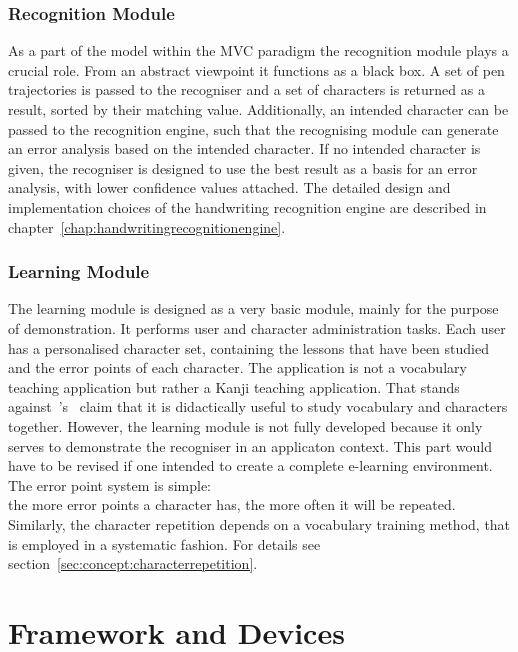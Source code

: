 \subsubsection{Recognition Module}
\label{sec:arch:recognitionmodule}
As a part of the model within the MVC paradigm the recognition module plays
a crucial role. From an abstract viewpoint it functions as a black box.
A set of pen trajectories is passed to the recogniser and a set of
characters is returned as a result, sorted by their matching value.
Additionally, an intended character can be passed to the recognition engine,
such that the recognising module can generate an error analysis based on the 
intended character. If no intended character is given, the recogniser is designed
to use the best result as a basis for an error analysis, with lower confidence
values attached. The detailed design and implementation choices of the 
handwriting recognition engine are described in 
chapter~\ref{chap:handwritingrecognitionengine}.

\subsubsection{Learning Module}
\label{sec:arch:learningmodule}

The learning module is designed as a very basic module, mainly for the purpose of 
demonstration. It performs user and character administration tasks.
Each user has a personalised character set, containing the lessons that have been
studied and the error points of each character.
The application is not a vocabulary teaching application 
but rather a Kanji teaching application. That stands 
against~\shortciteANP{}'s~\citeyear{} claim that it is didactically useful 
to study  vocabulary and characters together. However,
the learning module is not fully developed because it only serves to demonstrate
the recogniser in an applicaton context. This part would have to be revised
if one intended to create a complete e-learning environment.
The error point system is simple:\\
the more error points a character has, the more often it will be repeated.
Similarly, the character repetition depends on a vocabulary training method,
that is employed in a systematic fashion. For details see 
section~\ref{sec:concept:characterrepetition}.

\section{Framework and Devices}
\label{sec:frameworkanddevices}

